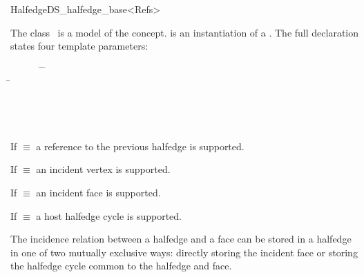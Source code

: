 
\ccRefPageBegin



\begin{ccRefClass}{HalfedgeDS_halfedge_base<Refs>}

\ccDefinition
  
The class \ccRefName\ is a model of the 
concept.  is an instantiation of a . 
The full declaration states four template parameters:

\begin{tabbing}
\mbox{}~~~~~~ \=  \=\\
              \> \> \=\\
              \> \> \> \\
              \> \> \> \\
              \> \> \> \\
     \> 
\end{tabbing}

If  $\equiv$  a reference to the previous
halfedge is supported.

If  $\equiv$  an incident vertex is
supported.

If  $\equiv$  an incident face is
supported.

{ If  $\equiv$  a host halfedge cycle  is
supported.}

{
The incidence relation between a halfedge and a face can be stored in a halfedge in 
one of two mutually exclusive ways: directly storing the incident face or
storing the halfedge cycle common to the halfedge and face.
}


\end{ccRefClass}
